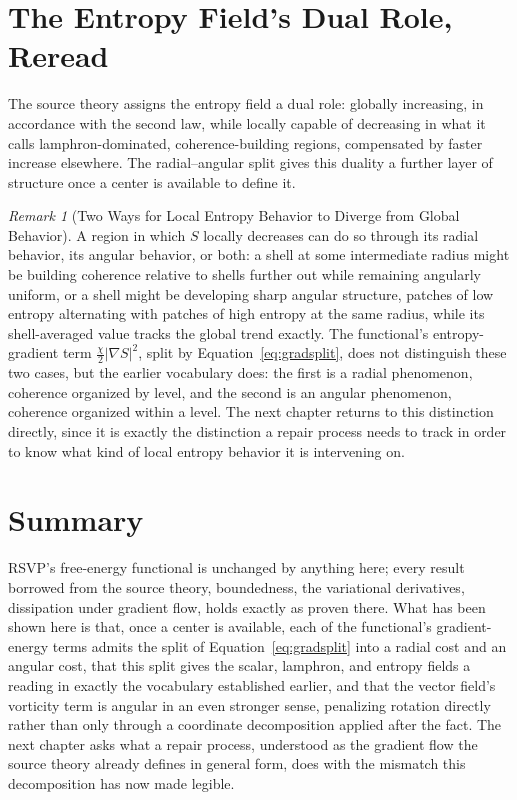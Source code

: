 \documentclass[11pt,fleqn]{book}
\numberwithin{equation}{chapter}
\theoremstyle{plain}
\theoremstyle{definition}
\theoremstyle{remark}
\newtheorem{remark}[theorem]{Remark}
\begin{document}
\section{The Entropy Field's Dual Role, Reread}

The source theory assigns the entropy field a dual role: globally increasing, in accordance with the second law, while locally capable of decreasing in what it calls lamphron-dominated, coherence-building regions, compensated by faster increase elsewhere. The radial--angular split gives this duality a further layer of structure once a center is available to define it.

\begin{remark}[Two Ways for Local Entropy Behavior to Diverge from Global Behavior]
A region in which \(S\) locally decreases can do so through its radial behavior, its angular behavior, or both: a shell at some intermediate radius might be building coherence relative to shells further out while remaining angularly uniform, or a shell might be developing sharp angular structure, patches of low entropy alternating with patches of high entropy at the same radius, while its shell-averaged value tracks the global trend exactly. The functional's entropy-gradient term \(\frac\chi2|\nabla S|^2\), split by Equation~\eqref{eq:gradsplit}, does not distinguish these two cases, but the earlier vocabulary does: the first is a radial phenomenon, coherence organized by level, and the second is an angular phenomenon, coherence organized within a level. The next chapter returns to this distinction directly, since it is exactly the distinction a repair process needs to track in order to know what kind of local entropy behavior it is intervening on.
\end{remark}

\section{Summary}

RSVP's free-energy functional is unchanged by anything here; every result borrowed from the source theory, boundedness, the variational derivatives, dissipation under gradient flow, holds exactly as proven there. What has been shown here is that, once a center is available, each of the functional's gradient-energy terms admits the split of Equation~\eqref{eq:gradsplit} into a radial cost and an angular cost, that this split gives the scalar, lamphron, and entropy fields a reading in exactly the vocabulary established earlier, and that the vector field's vorticity term is angular in an even stronger sense, penalizing rotation directly rather than only through a coordinate decomposition applied after the fact. The next chapter asks what a repair process, understood as the gradient flow the source theory already defines in general form, does with the mismatch this decomposition has now made legible.
\end{document}
